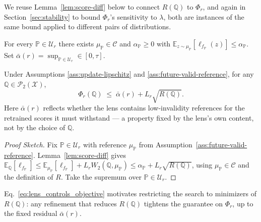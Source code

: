 We reuse Lemma~\ref{lem:score-diff} below to connect $R(\mathbb Q)$ to $\Phi_r$, and again in Section~\ref{sec:stability} to bound $\Phi_r$'s sensitivity to $\lambda$, both are instances of the same bound applied to different pairs of distributions.

\begin{assumption}\label{ass:future-valid-reference}
    For every $\mathbb{P}\in\mathcal U_r$ there exists $\mu_\mathbb{P}\in \mathcal{C}$ and $\alpha_{\mathbb{P}}\geq 0$ with $\mathbb E_{z\sim\mu_\mathbb{P}}\left[\ell_{f_\mathbb{P}}(z)\right] \le \alpha_\mathbb{P}$. Set $\bar\alpha(r)=\sup_{\mathbb{P} \in \mathcal{U}_r} \in[0,\tau]$.
\end{assumption}

\begin{proposition}\label{prob:future-validity}
Under Assumptions \ref{ass:update-lipschitz} and \ref{ass:future-valid-reference}, for any $\mathbb{Q} \in \mathcal{P}_2(\mathcal{X})$,
\begin{equation}
\Phi_r(\mathbb Q) \;\le\; \bar\alpha(r) + L_r\sqrt{R(\mathbb Q)}.
\label{eq:lens_controls_objective}
\end{equation}
Here $\bar\alpha(r)$ reflects whether the lens contains low-invalidity references for the retrained scores it must withstand — a property fixed by the lens's own content, not by the choice of $\mathbb Q$.
\end{proposition}

\begin{proof}[Proof Sketch]
    Fix $\mathbb{P}\in\mathcal U_r$ with reference $\mu_\mathbb{P}$ from Assumption~\ref{ass:future-valid-reference}. Lemma~\ref{lem:score-diff} gives $\mathbb E_{\mathbb Q}[\ell_{f_\mathbb{P}}] \le \mathbb E_{\mu_\mathbb{P}}[\ell_{f_\mathbb{P}}] + L_r W_2(\mathbb Q,\mu_\mathbb{P}) \le \alpha_\mathbb{P} + L_r\sqrt{R(\mathbb Q)}$, using $\mu_\mathbb{P}\in\mathcal C$ and the definition of $R$. Take the supremum over $\mathbb{P}\in\mathcal U_r$.
\end{proof}

Eq.~\ref{eq:lens_controls_objective} motivates restricting the search to minimizers of $R(\mathbb Q)$: any refinement that reduces $R(\mathbb Q)$ tightens the guarantee on $\Phi_r$, up to the fixed residual $\bar\alpha(r)$.

\color{black}



